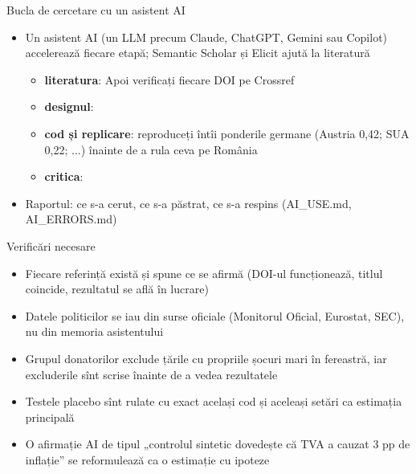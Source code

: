 \begin{frame}{Bucla de cercetare cu un asistent AI}
\itemsize{\footnotesize}
\begin{itemize}
    \item Un asistent AI (un LLM precum Claude, ChatGPT, Gemini sau Copilot) accelerează fiecare etapă; Semantic Scholar și Elicit ajută la literatură
    \begin{itemize}
        \item \textbf{literatura}:  Apoi verificați fiecare DOI pe Crossref
        \item \textbf{designul}: 
        \item \textbf{cod și replicare}: reproduceți întîi ponderile germane (Austria 0{,}42; SUA 0{,}22; ...) înainte de a rula ceva pe România
        \item \textbf{critica}: 
    \end{itemize}
    \item Raportul: ce s-a cerut, ce s-a păstrat, ce s-a respins (AI\_USE.md, AI\_ERRORS.md)
\end{itemize}
\end{frame}

\begin{frame}{Verificări necesare}
\itemsize{\small}
\begin{itemize}
    \item Fiecare referință există și spune ce se afirmă (DOI-ul funcționează, titlul coincide, rezultatul se află în lucrare)
    \item Datele politicilor se iau din surse oficiale (Monitorul Oficial, Eurostat, SEC), nu din memoria asistentului
    \item Grupul donatorilor exclude țările cu propriile șocuri mari în fereastră, iar excluderile sînt scrise înainte de a vedea rezultatele
    \item Testele placebo sînt rulate cu exact același cod și aceleași setări ca estimația principală
    \item O afirmație AI de tipul „controlul sintetic dovedește că TVA a cauzat 3 pp de inflație” se reformulează ca o estimație cu ipoteze
\end{itemize}
\end{frame}

